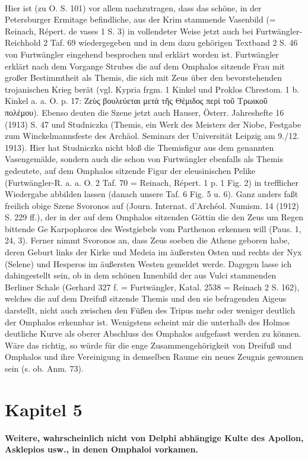 \documentclass[a4paper, 11pt, oneside]{article}
\begin{document}
\paragraph{}
Hier ist (zu O. S. 101) vor allem nachzutragen, dass das schöne, in der Petersburger Ermitage befindliche, aus der Krim stammende Vasenbild (= Reinach, Répert. de vases 1 S. 3) in vollendeter Weise jetzt auch bei Furtwängler-Reichhold 2 Taf. 69 wiedergegeben und in dem dazu gehörigen Textband 2 S. 46 von Furtwängler eingehend besprochen und erklärt worden ist. Furtwängler erklärt nach dem Vorgange Strubes die auf dem Omphalos sitzende Frau mit großer Bestimmtheit als Themis, die sich mit Zeus über den bevorstehenden trojanischen Krieg berät (vgl. Kypria frgm. 1 Kinkel und Proklos Chrestom. 1 b. Kinkel a. a. O. p. 17: Ζεὺς βουλεύεται μετὰ τῆς Θέμιδος περὶ τοῦ Τρωικοῦ πολέμου). Ebenso deuten die Szene jetzt auch Hauser, Österr. Jahreshefte 16 (1913) S. 47 und Studniczka (Themis, ein Werk des Meisters der Niobe, Festgabe zum Winckelmannsfeste des Archäol. Seminars der Universität Leipzig am 9./12. 1913). Hier hat Studniczka nicht bloß die Themisfigur aus dem genannten Vasengemälde, sondern auch die schon von Furtwängler ebenfalls als Themis gedeutete, auf dem Omphalos sitzende Figur der eleusinischen Pelike (Furtwängler-R. a. a. O. 2 Taf. 70 = Reinach, Répert. 1 p. 1 Fig. 2) in trefflicher Wiedergabe abbilden lassen (danach unsere Taf. 6 Fig. 5 u. 6). Ganz anders faßt freilich obige Szene Svoronos auf (Journ. Internat. d'Archéol. Numism. 14 (1912) S. 229 ff.), der in der auf dem Omphalos sitzenden Göttin die den Zeus um Regen bittende Ge Karpophoros des Westgiebels vom Parthenon erkennen will (Paus. 1, 24, 3). Ferner nimmt Svoronos an, dass Zeus soeben die Athene geboren habe, deren Geburt links der Kirke und Medeia im äußersten Osten und rechts der Nyx (Selene) und Hesperos im äußersten Westen gemeldet werde. Dagegen lasse ich dahingestellt sein, ob in dem schönen Innenbild der aus Vulci stammenden Berliner Schale (Gerhard 327 f. = Furtwängler, Katal. 2538 = Reinach 2 S. 162), welches die auf dem Dreifuß sitzende Themis und den sie befragenden Aigeus darstellt, nicht auch zwischen den Füßen des Tripus mehr oder weniger deutlich der Omphalos erkennbar ist. Wenigstens scheint mir die unterhalb des Holmos deutliche Kurve als oberer Abschluss des Omphalos aufgefasst werden zu können. Wäre das richtig, so würde für die enge Zusammengehörigkeit von Dreifuß und Omphalos und ihre Vereinigung in demselben Raume ein neues Zeugnis gewonnen sein (s. ob. Anm. 73).
\clearpage
\section{Kapitel 5}
\begin{center}
\textbf{Weitere, wahrscheinlich nicht von Delphi abhängige Kulte des Apollon, Asklepios usw., in denen Omphaloi vorkamen.}
\end{center}
\end{document}
